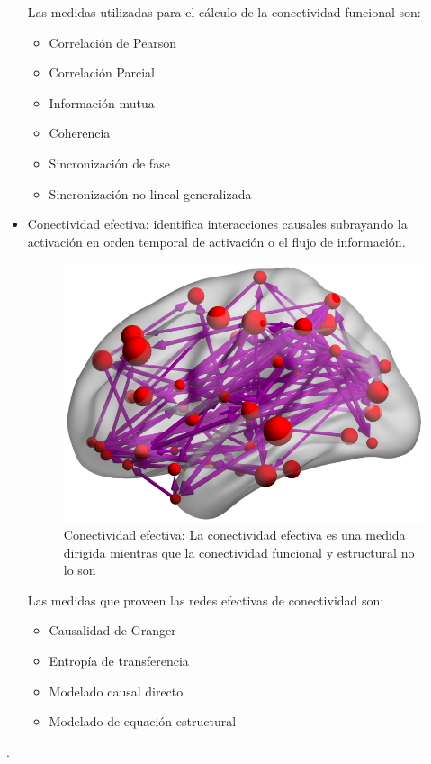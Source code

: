 \begin{itemize}
	Las medidas utilizadas para el cálculo de la conectividad funcional son:
	\begin{itemize}
		\item Correlación de Pearson
		\item Correlación Parcial
		\item Información mutua
		\item Coherencia
		\item Sincronización de fase
		\item Sincronización no lineal generalizada
	\end{itemize}
	
	\item Conectividad efectiva: identifica interacciones causales subrayando la activación en orden temporal de activación o el flujo de información.
	
	\begin{figure}[H]
  		\centering
    	\includegraphics[scale=0.5]{img/eff_conect.png}
  		\caption{Conectividad efectiva: La conectividad efectiva es una medida dirigida mientras que la conectividad funcional y estructural no lo son}         \label{preproc:eff_conect}
	\end{figure}	
	
	Las medidas que proveen las redes efectivas de conectividad son:
	\begin{itemize}
		\item Causalidad de Granger
		\item Entropía de transferencia
		\item Modelado causal directo
		\item Modelado de equación estructural
	\end{itemize}
	
\end{itemize}
\cite{brainhack}.

